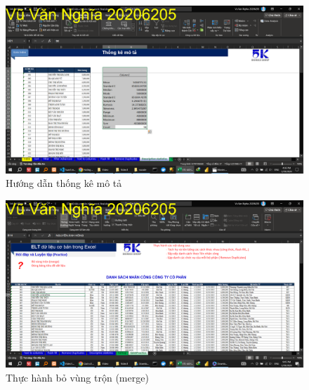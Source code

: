 \documentclass{article}
\begin{document}
\begin{figure}[h]
    \centering
    \includegraphics[scale = 0.15]{Video1/HuongDan/13.png}
    \caption{Hướng dẫn thống kê mô tả}
\end{figure}




\begin{figure}[h]
    \centering
    \includegraphics[scale = 0.15]{Video1/ThucHanh/1.png}
    \caption{Thực hành bỏ vùng trộn (merge)}
\end{figure}
\end{document}
